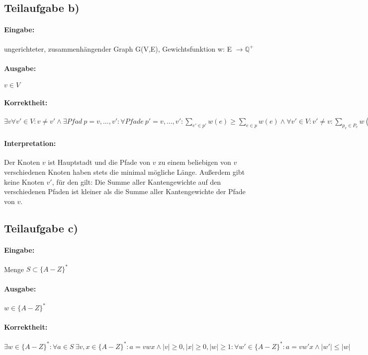 \documentclass[12pt]{scrartcl}%
\theoremstyle{nonumberplain}
\newcommand{\Q}{\mathbb{Q}}
\begin{document}
\subsection*{Teilaufgabe b)}

\paragraph{Eingabe:} ungerichteter, zusammenhängender Graph G(V,E), Gewichtsfunktion w: E $\rightarrow \Q ^+$
\paragraph{Ausgabe:} $v \in V$
\paragraph{Korrektheit:} $\exists v \forall v' \in V: v \not= v' \wedge \exists Pfad \ p = v,...,v': \forall Pfade \ p' = v,...,v':  \sum_{e' \in p'}^{}w(e) \ge \sum_{e \in p}^{}w(e) \wedge \forall v' \in V: v' \not= v : \sum_{p_v  \in P_v}{w(p_v)} < \sum_{p_{v'} \in P_{v'}}{w(p_{v'})}$

\paragraph{Interpretation:}
Der Knoten $v$ ist Hauptstadt und die Pfade von $v$ zu einem beliebigen von $v$ verschiedenen Knoten haben stets die minimal mögliche Länge. Außerdem gibt keine Knoten $v'$, für den gilt: Die Summe aller Kantengewichte auf den verschiedenen Pfaden ist kleiner als die Summe aller Kantengewichte der Pfade von $v$.

\subsection*{Teilaufgabe c)}

\paragraph{Eingabe:} Menge $S \subset \{A-Z\}^*$
\paragraph{Ausgabe:} $w \in \{A-Z\}^*$
\paragraph{Korrektheit:} $\exists w \in \{A-Z\}^*: \forall a \in S \ \exists v,x \in \{A-Z\}^*: a = vwx \wedge |v| \ge 0, |x| \ge 0, |w| \ge 1: \forall w' \in \{A-Z\}^*: a = vw'x \wedge  |w'| \le |w|$
\end{document}
